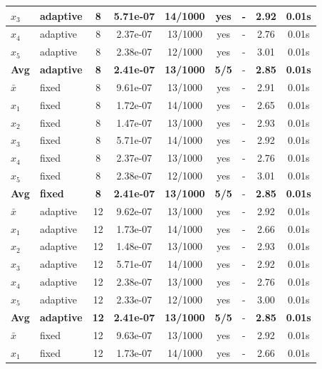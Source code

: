 \begin{longtable}{|l|l|c|c|c|c|c|c|c|}
\hline
$x_3$ & adaptive & 8 & 5.71e-07 & 14/1000 & yes & - & 2.92 & 0.01s \\
\hline
$x_4$ & adaptive & 8 & 2.37e-07 & 13/1000 & yes & - & 2.76 & 0.01s \\
\hline
$x_5$ & adaptive & 8 & 2.38e-07 & 12/1000 & yes & - & 3.01 & 0.01s \\
\hline
\hline\hline
\textbf{Avg} & \textbf{adaptive} & \textbf{8} & \textbf{2.41e-07} & \textbf{13/1000} & \textbf{5/5} & - & \textbf{2.85} & \textbf{0.01s} \\
\hline\hline
\hline
$\bar{x}$ & fixed & 8 & 9.61e-07 & 13/1000 & yes & - & 2.91 & 0.01s \\
\hline
$x_1$ & fixed & 8 & 1.72e-07 & 14/1000 & yes & - & 2.65 & 0.01s \\
\hline
$x_2$ & fixed & 8 & 1.47e-07 & 13/1000 & yes & - & 2.93 & 0.01s \\
\hline
$x_3$ & fixed & 8 & 5.71e-07 & 14/1000 & yes & - & 2.92 & 0.01s \\
\hline
$x_4$ & fixed & 8 & 2.37e-07 & 13/1000 & yes & - & 2.76 & 0.01s \\
\hline
$x_5$ & fixed & 8 & 2.38e-07 & 12/1000 & yes & - & 3.01 & 0.01s \\
\hline
\hline\hline
\textbf{Avg} & \textbf{fixed} & \textbf{8} & \textbf{2.41e-07} & \textbf{13/1000} & \textbf{5/5} & - & \textbf{2.85} & \textbf{0.01s} \\
\hline\hline
$\bar{x}$ & adaptive & 12 & 9.62e-07 & 13/1000 & yes & - & 2.92 & 0.01s \\
\hline
$x_1$ & adaptive & 12 & 1.73e-07 & 14/1000 & yes & - & 2.66 & 0.01s \\
\hline
$x_2$ & adaptive & 12 & 1.48e-07 & 13/1000 & yes & - & 2.93 & 0.01s \\
\hline
$x_3$ & adaptive & 12 & 5.71e-07 & 14/1000 & yes & - & 2.92 & 0.01s \\
\hline
$x_4$ & adaptive & 12 & 2.38e-07 & 13/1000 & yes & - & 2.76 & 0.01s \\
\hline
$x_5$ & adaptive & 12 & 2.33e-07 & 12/1000 & yes & - & 3.00 & 0.01s \\
\hline
\hline\hline
\textbf{Avg} & \textbf{adaptive} & \textbf{12} & \textbf{2.41e-07} & \textbf{13/1000} & \textbf{5/5} & - & \textbf{2.85} & \textbf{0.01s} \\
\hline\hline
\hline
$\bar{x}$ & fixed & 12 & 9.63e-07 & 13/1000 & yes & - & 2.92 & 0.01s \\
\hline
$x_1$ & fixed & 12 & 1.73e-07 & 14/1000 & yes & - & 2.66 & 0.01s \\

\end{longtable}
